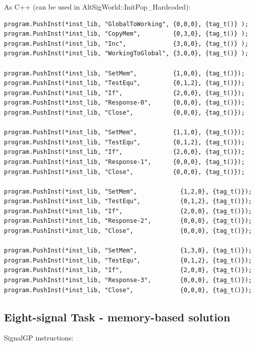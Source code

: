 \documentclass[
]{book}
\begin{document}
As C++ (can be used in AltSigWorld::InitPop\_Hardcoded):

\begin{verbatim}
program.PushInst(*inst_lib, "GlobalToWorking", {0,0,0}, {tag_t()} );
program.PushInst(*inst_lib, "CopyMem",         {0,3,0}, {tag_t()} );
program.PushInst(*inst_lib, "Inc",             {3,0,0}, {tag_t()} );
program.PushInst(*inst_lib, "WorkingToGlobal", {3,0,0}, {tag_t()} );

program.PushInst(*inst_lib, "SetMem",          {1,0,0}, {tag_t()});
program.PushInst(*inst_lib, "TestEqu",         {0,1,2}, {tag_t()});
program.PushInst(*inst_lib, "If",              {2,0,0}, {tag_t()});
program.PushInst(*inst_lib, "Response-0",      {0,0,0}, {tag_t()});
program.PushInst(*inst_lib, "Close",           {0,0,0}, {tag_t()});

program.PushInst(*inst_lib, "SetMem",          {1,1,0}, {tag_t()});
program.PushInst(*inst_lib, "TestEqu",         {0,1,2}, {tag_t()});
program.PushInst(*inst_lib, "If",              {2,0,0}, {tag_t()});
program.PushInst(*inst_lib, "Response-1",      {0,0,0}, {tag_t()});
program.PushInst(*inst_lib, "Close",           {0,0,0}, {tag_t()});

program.PushInst(*inst_lib, "SetMem",            {1,2,0}, {tag_t()});
program.PushInst(*inst_lib, "TestEqu",           {0,1,2}, {tag_t()});
program.PushInst(*inst_lib, "If",                {2,0,0}, {tag_t()});
program.PushInst(*inst_lib, "Response-2",        {0,0,0}, {tag_t()});
program.PushInst(*inst_lib, "Close",             {0,0,0}, {tag_t()});

program.PushInst(*inst_lib, "SetMem",            {1,3,0}, {tag_t()});
program.PushInst(*inst_lib, "TestEqu",           {0,1,2}, {tag_t()});
program.PushInst(*inst_lib, "If",                {2,0,0}, {tag_t()});
program.PushInst(*inst_lib, "Response-3",        {0,0,0}, {tag_t()});
program.PushInst(*inst_lib, "Close",             {0,0,0}, {tag_t()});
\end{verbatim}

\hypertarget{eight-signal-task---memory-based-solution}{%
\subsection{Eight-signal Task - memory-based solution}\label{eight-signal-task---memory-based-solution}}

SignalGP instructions:
\end{document}
